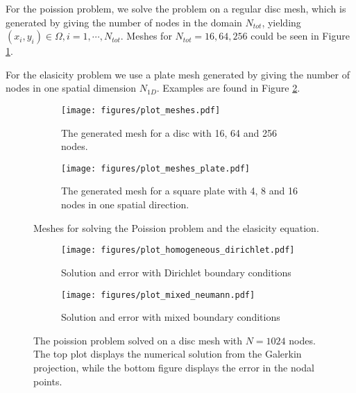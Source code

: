 \documentclass[a4paper,english]{elsarticle}%
\begin{document}
For the poission problem, we solve the problem on a regular disc mesh, which is generated by giving the number of nodes in the domain $N_{tot}$, yielding  $(x_i,y_i) \in \Omega, i = 1,\cdots,N_{tot}$. Meshes for $N_{tot} = 16,64,256$ could be seen in Figure \ref{plot-meshes}.

For the elasicity problem we use a plate mesh generated by giving the number of nodes in one spatial dimension $N_{1D}$. Examples are found in Figure \ref{plot-meshes-plate}.




\begin{figure}[ht]
    \begin{subfigure}[t]{1\textwidth}
        \centering
        \texttt{[image: figures/plot\_meshes.pdf]}
    \caption{The generated mesh for a disc with 16, 64 and 256 nodes. }
    \label{plot-meshes}
    \end{subfigure}\qquad
    \begin{subfigure}[b]{1\textwidth}
        \centering
        \texttt{[image: figures/plot\_meshes\_plate.pdf]}
    \caption{The generated mesh for a square plate with 4, 8 and 16 nodes in one spatial direction.}
    \label{plot-meshes-plate}
    \end{subfigure}
    \label{meshes}
    \caption{Meshes for solving the Poission problem and the elasicity equation.}
\end{figure}





\begin{figure}[ht]
    \begin{subfigure}[b]{0.5\textwidth}
        \centering
            \texttt{[image: figures/plot\_homogeneous\_dirichlet.pdf]}
            \caption{Solution and error with Dirichlet boundary conditions}
        \label{solution-error-dirichlet}
    \end{subfigure}\qquad
    \begin{subfigure}[b]{0.5\textwidth}
        \centering
            \texttt{[image: figures/plot\_mixed\_neumann.pdf]}
            \caption{Solution and error with mixed boundary conditions}
        \label{solution-error-mixed}
    \end{subfigure}
    \label{plot-solution-error}
    \caption{The poission problem solved on a disc mesh with $N = 1024$ nodes.
    The top plot displays the numerical solution from the Galerkin projection,
    while the bottom figure displays the error in the nodal points.}
\end{figure}
\end{document}
